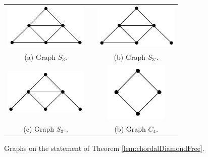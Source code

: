 
\begin{figure}[h]
  \centering
  \begin{tabular}{  c p{0.7cm} c }
    \centering
    \includegraphics[width=4cm]{img/s3.png} & &
    \includegraphics[width=4cm]{img/s3-1.png}
    \\
    \footnotesize \centering 
    (a)  \footnotesize Graph $S_3$. &&  \footnotesize (b) Graph $S_{3'}$. \\
    
      \centering 
      \includegraphics[width=4cm]{img/s3-2.png} & &
    \includegraphics[width=3cm]{img/c4.png}
    \\
    \footnotesize \centering 
    (c)  \footnotesize Graph $S_{3''}$. && \footnotesize (b) Graph $C_{4}$.\\
  \end{tabular}

 \caption{Graphs on the statement of Theorem \ref{lem:chordalDiamondFree}.}
 \label{fig:proibidos}
\end{figure} 
